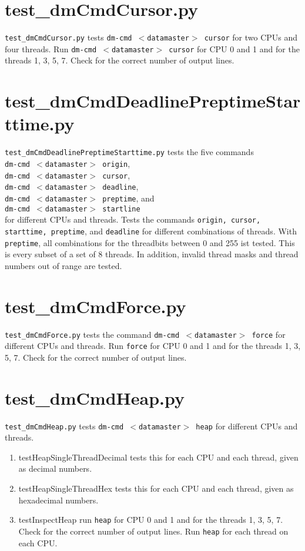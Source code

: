\documentclass[12pt,a4paper]{report}
\begin{document}
\section{test\_dmCmdCursor.py}
\texttt{test\_dmCmdCursor.py} tests \texttt{dm-cmd $<$datamaster$>$ cursor}
for two CPUs and four threads. Run \texttt{dm-cmd $<$datamaster$>$ cursor}
for CPU 0 and 1 and for the threads 1, 3, 5, 7.
Check for the correct number of output lines.

\section{test\_dmCmdDeadlinePreptimeStarttime.py}
\texttt{test\_dmCmdDeadlinePreptimeStarttime.py} tests the five commands \\
\texttt{dm-cmd $<$datamaster$>$ origin}, \\
\texttt{dm-cmd $<$datamaster$>$ cursor}, \\
\texttt{dm-cmd $<$datamaster$>$ deadline}, \\
\texttt{dm-cmd $<$datamaster$>$ preptime}, and \\
\texttt{dm-cmd $<$datamaster$>$ startline} \\
for different CPUs and threads.
Tests the commands \texttt{origin, cursor, starttime, preptime}, and
\texttt{deadline} for different combinations  of threads.
With \texttt{preptime}, all combinations for the threadbits between 0
and 255 ist tested. This is every subset of a
set of 8 threads. In addition, invalid thread masks and thread numbers
out of range are tested.

\section{test\_dmCmdForce.py}
\texttt{test\_dmCmdForce.py} tests the command \texttt{dm-cmd
$<$datamaster$>$ force} for different CPUs and threads.
Run \texttt{force} for CPU 0 and 1 and for the threads 1, 3, 5, 7.
Check for the correct number of output lines.

\section{test\_dmCmdHeap.py}
\texttt{test\_dmCmdHeap.py} tests \texttt{dm-cmd $<$datamaster$>$ heap}
for different CPUs and threads.
\begin{enumerate}
\item testHeapSingleThreadDecimal tests this for each CPU and each
thread, given as decimal numbers.
\item testHeapSingleThreadHex tests this for each CPU and each thread,
given as hexadecimal numbers.
\item testInspectHeap run \texttt{heap} for CPU 0 and 1 and for the
threads 1, 3, 5, 7. Check for the correct number of output lines.
Run \texttt{heap} for each thread on each CPU.
\end{enumerate}
\end{document}

